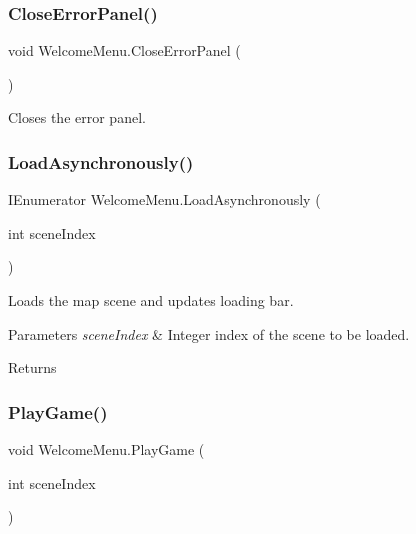 \mbox{\label{class_welcome_menu_a9846e9fbed6c907ed83f6137b7a82b86}} 
\subsubsection{\texorpdfstring{CloseErrorPanel()}{CloseErrorPanel()}}
{\footnotesize\ttfamily void Welcome\+Menu.\+Close\+Error\+Panel (\begin{DoxyParamCaption}{ }\end{DoxyParamCaption})}



Closes the error panel. 

\mbox{\label{class_welcome_menu_a2ff8c7bf9424de134a1ec63723841220}} 
\subsubsection{\texorpdfstring{LoadAsynchronously()}{LoadAsynchronously()}}
{\footnotesize\ttfamily I\+Enumerator Welcome\+Menu.\+Load\+Asynchronously (\begin{DoxyParamCaption}\item[{int}]{scene\+Index }\end{DoxyParamCaption})\hspace{0.3cm}{\ttfamily [private]}}



Loads the map scene and updates loading bar. 


\begin{DoxyParams}{Parameters}
{\em scene\+Index} & Integer index of the scene to be loaded.\\
\hline
\end{DoxyParams}
\begin{DoxyReturn}{Returns}

\end{DoxyReturn}
\mbox{\label{class_welcome_menu_a32c738d5cd2259a5ca5a40a41f96a501}} 
\subsubsection{\texorpdfstring{PlayGame()}{PlayGame()}}
{\footnotesize\ttfamily void Welcome\+Menu.\+Play\+Game (\begin{DoxyParamCaption}\item[{int}]{scene\+Index }\end{DoxyParamCaption})}




